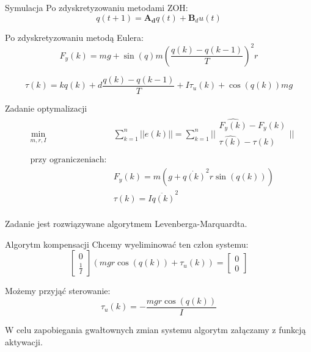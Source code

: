 \documentclass{beamer}
\begin{document}
\begin{frame}{Symulacja}
Po zdyskretyzowaniu metodami ZOH:
\begin{equation}
q(t+1) = \mathbf{A_d}q(t) + \mathbf{B}_du(t)
\label{eq:dyskretny}
\end{equation}

Po zdyskretyzowaniu metodą Eulera:
\begin{equation}
F_{y}(k) = mg + \sin{(q)}m(\frac{q(k)-q(k-1)}{T})^2 r
\end{equation}

\begin{equation}
\tau(k) = kq(k) + d\frac{q(k)-q(k-1)}{T} + I\tau_u(k) + \cos(q(k))mg
\end{equation}
\end{frame}

\begin{frame}{Zadanie optymalizacji}
\begin{equation}
\begin{aligned}
& \underset{m, r, I}{\text{min}}
&  \sum_{k=1}^{n} || e(k) || = \sum_{k = 1}^{n} || \begin{matrix}
\hat{F_y(k)}-F_y(k) \\
\hat{\tau(k)}-\tau(k) \\
\end{matrix} || \\
& \text{przy ograniczeniach:}\\
& & F_{y}(k) = m(g + \dot{q(k)}^2r\sin{(q(k))})\\
& & \tau(k) = I\ddot{q(k)}^2\\
\end{aligned}
\end{equation}

Zadanie jest rozwiązywane algorytmem Levenberga-Marquardta.
\end{frame}

\begin{frame}{Algorytm kompensacji}
Chcemy wyeliminować ten człon systemu:
\begin{equation}
	\begin{bmatrix}
	0 \\
	\frac{1}{I}
	\end{bmatrix}
	(mgr\cos{(q(k))} + \tau_u(k)) = 	\begin{bmatrix}
	0 \\
	0
	\end{bmatrix}
\end{equation}

Możemy przyjąć sterowanie:
\begin{equation}
\tau_u(k) = -\frac{mgr\cos{(q(k))}}{I}
\end{equation}

W celu zapobiegania gwałtownych zmian systemu algorytm załączamy z funkcją aktywacji.
\end{frame}
\end{document}
